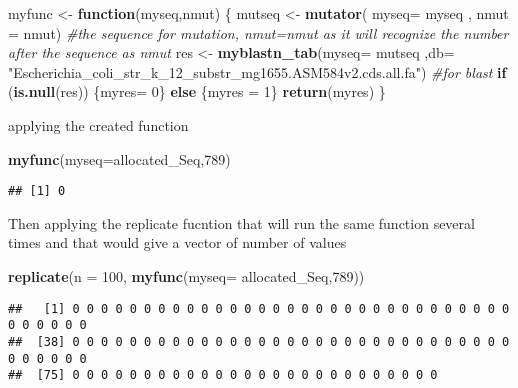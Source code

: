 \documentclass[]{article}
\newenvironment{Shaded}{\begin{snugshade}}{\end{snugshade}}
\newcommand{\CommentTok}[1]{\textcolor[rgb]{0.56,0.35,0.01}{\textit{#1}}}
\newcommand{\ControlFlowTok}[1]{\textcolor[rgb]{0.13,0.29,0.53}{\textbf{#1}}}
\newcommand{\DataTypeTok}[1]{\textcolor[rgb]{0.13,0.29,0.53}{#1}}
\newcommand{\DecValTok}[1]{\textcolor[rgb]{0.00,0.00,0.81}{#1}}
\newcommand{\KeywordTok}[1]{\textcolor[rgb]{0.13,0.29,0.53}{\textbf{#1}}}
\newcommand{\NormalTok}[1]{#1}
\newcommand{\StringTok}[1]{\textcolor[rgb]{0.31,0.60,0.02}{#1}}
\begin{document}
\begin{Shaded}
\begin{Highlighting}[]
\NormalTok{myfunc <-}\StringTok{ }\ControlFlowTok{function}\NormalTok{(myseq,nmut) \{ }
\NormalTok{  mutseq <-}\StringTok{ }\KeywordTok{mutator}\NormalTok{( }\DataTypeTok{myseq=}\NormalTok{ myseq , }\DataTypeTok{nmut =}\NormalTok{ nmut) }\CommentTok{#the sequence for mutation, nmut=nmut as it will recognize the number after the sequence as nmut }
\NormalTok{  res <-}\StringTok{ }\KeywordTok{myblastn_tab}\NormalTok{(}\DataTypeTok{myseq=}\NormalTok{ mutseq ,}\DataTypeTok{db=} \StringTok{"Escherichia_coli_str_k_12_substr_mg1655.ASM584v2.cds.all.fa"}\NormalTok{) }\CommentTok{#for blast}
  \ControlFlowTok{if}\NormalTok{ (}\KeywordTok{is.null}\NormalTok{(res)) \{myres=}\StringTok{ }\DecValTok{0}\NormalTok{\} }\ControlFlowTok{else}\NormalTok{ \{myres =}\StringTok{ }\DecValTok{1}\NormalTok{\} }
  \KeywordTok{return}\NormalTok{(myres) }
\NormalTok{\}}
\end{Highlighting}
\end{Shaded}

applying the created function

\begin{Shaded}
\begin{Highlighting}[]
\KeywordTok{myfunc}\NormalTok{(}\DataTypeTok{myseq=}\NormalTok{allocated_Seq,}\DecValTok{789}\NormalTok{)}
\end{Highlighting}
\end{Shaded}

\begin{verbatim}
## [1] 0
\end{verbatim}

Then applying the replicate fucntion that will run the same function
several times and that would give a vector of number of values

\begin{Shaded}
\begin{Highlighting}[]
\KeywordTok{replicate}\NormalTok{(}\DataTypeTok{n =} \DecValTok{100}\NormalTok{, }\KeywordTok{myfunc}\NormalTok{(}\DataTypeTok{myseq=}\NormalTok{ allocated_Seq,}\DecValTok{789}\NormalTok{))}
\end{Highlighting}
\end{Shaded}

\begin{verbatim}
##   [1] 0 0 0 0 0 0 0 0 0 0 0 0 0 0 0 0 0 0 0 0 0 0 0 0 0 0 0 0 0 0 0 0 0 0 0 0 0
##  [38] 0 0 0 0 0 0 0 0 0 0 0 0 0 0 0 0 0 0 0 0 0 0 0 0 0 0 0 0 0 0 0 0 0 0 0 0 0
##  [75] 0 0 0 0 0 0 0 0 0 0 0 0 0 0 0 0 0 0 0 0 0 0 0 0 0 0
\end{verbatim}
\end{document}
